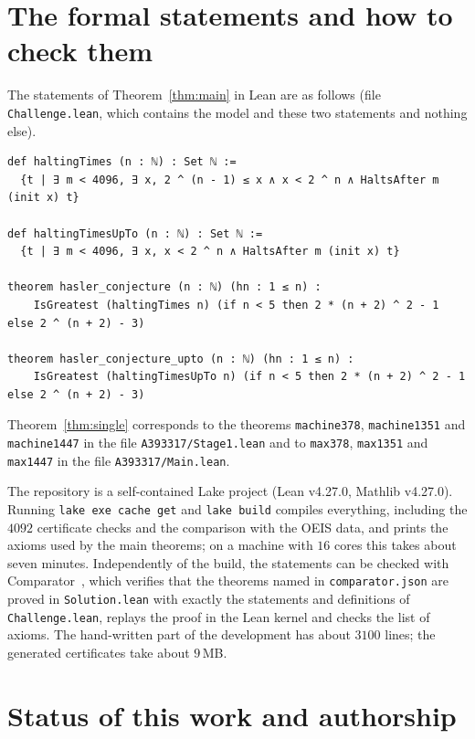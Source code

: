 \documentclass[11pt,a4paper]{amsart}
\theoremstyle{definition}
\theoremstyle{remark}
\newcommand{\lean}[1]{\texttt{#1}}
\begin{document}
\section{The formal statements and how to check them}\label{sec:formal}

The statements of Theorem~\ref{thm:main} in Lean are as follows (file \lean{Challenge.lean}, which contains the
model and these two statements and nothing else).

{\footnotesize
\begin{verbatim}
def haltingTimes (n : ℕ) : Set ℕ :=
  {t | ∃ m < 4096, ∃ x, 2 ^ (n - 1) ≤ x ∧ x < 2 ^ n ∧ HaltsAfter m (init x) t}

def haltingTimesUpTo (n : ℕ) : Set ℕ :=
  {t | ∃ m < 4096, ∃ x, x < 2 ^ n ∧ HaltsAfter m (init x) t}

theorem hasler_conjecture (n : ℕ) (hn : 1 ≤ n) :
    IsGreatest (haltingTimes n) (if n < 5 then 2 * (n + 2) ^ 2 - 1 else 2 ^ (n + 2) - 3)

theorem hasler_conjecture_upto (n : ℕ) (hn : 1 ≤ n) :
    IsGreatest (haltingTimesUpTo n) (if n < 5 then 2 * (n + 2) ^ 2 - 1 else 2 ^ (n + 2) - 3)
\end{verbatim}
}

\noindent Theorem~\ref{thm:single} corresponds to the theorems \lean{machine378}, \lean{machine1351} and
\lean{machine1447} in the file \lean{A393317/Stage1.lean} and to \lean{max378}, \lean{max1351} and
\lean{max1447} in the file \lean{A393317/Main.lean}.

The repository is a self-contained Lake project (Lean v4.27.0, Mathlib v4.27.0). Running
\lean{lake exe cache get} and \lean{lake build} compiles everything, including the $4092$ certificate checks
and the comparison with the OEIS data, and prints the axioms used by the main theorems; on a machine with $16$
cores this takes about seven minutes. Independently of the build, the statements can be checked with
Comparator~\cite{comparator}, which verifies that the theorems named in \lean{comparator.json} are proved in
\lean{Solution.lean} with exactly the statements and definitions of \lean{Challenge.lean}, replays the proof in
the Lean kernel and checks the list of axioms. The hand-written part of the development has about $3100$
lines; the generated certificates take about $9$\,MB.

\section{Status of this work and authorship}\label{sec:status}
\end{document}
